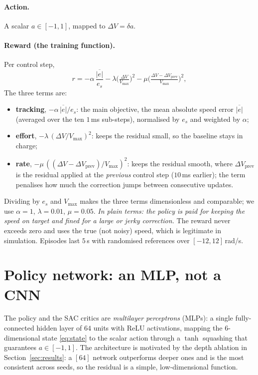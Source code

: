 \documentclass[10pt,twocolumn]{article}
\newcommand{\eli}[1]{\textit{In plain terms: #1}}
\begin{document}
\paragraph{Action.} A scalar $a\in[-1,1]$, mapped to
$\Delta V=\delta a$.

\paragraph{Reward (the training function).} Per control step,
\begin{equation}
  r = -\alpha\,\frac{\overline{|e|}}{e_s}
      - \lambda\Big(\tfrac{\Delta V}{V_{\max}}\Big)^2
      - \mu\Big(\tfrac{\Delta V-\Delta V_{\mathrm{prev}}}{V_{\max}}\Big)^2,
  \label{eq:reward}
\end{equation}
The three terms are:
\begin{itemize}\setlength\itemsep{1pt}
\item \textbf{tracking}, $-\alpha\,\overline{|e|}/e_s$: the main
objective, the mean absolute speed error $\overline{|e|}$ (averaged over
the ten $1$\,ms sub-steps), normalised by $e_s$ and weighted by $\alpha$;
\item \textbf{effort}, $-\lambda\,(\Delta V/V_{\max})^2$: keeps the
residual small, so the baseline stays in charge;
\item \textbf{rate}, $-\mu\,((\Delta V-\Delta V_{\mathrm{prev}})/V_{\max})^2$: keeps
the residual smooth, where $\Delta V_{\mathrm{prev}}$ is the residual applied at the
\emph{previous} control step ($10$\,ms earlier); the term penalises how
much the correction jumps between consecutive updates.
\end{itemize}
Dividing by $e_s$ and $V_{\max}$ makes the three terms dimensionless and
comparable; we use $\alpha=1$, $\lambda=0.01$, $\mu=0.05$.
\eli{the policy is paid for keeping the speed on target and fined for a
large or jerky correction.}
The reward never exceeds zero and uses the true (not noisy) speed, which
is legitimate in simulation. Episodes last $5$\,s with randomised
references over $[-12,12]$\,rad/s.

\section{Policy network: an MLP, not a CNN}
The policy and the SAC critics are \emph{multilayer perceptrons}
(MLPs): a single fully-connected hidden layer of $64$ units with ReLU
activations, mapping the $6$-dimensional state \eqref{eq:state} to the
scalar action through a $\tanh$ squashing that guarantees
$a\in[-1,1]$. The architecture is motivated by the depth ablation in
Section~\ref{sec:results}: a $[64]$ network outperforms deeper ones
and is the most consistent across seeds, so the residual is a simple,
low-dimensional function.
\end{document}
